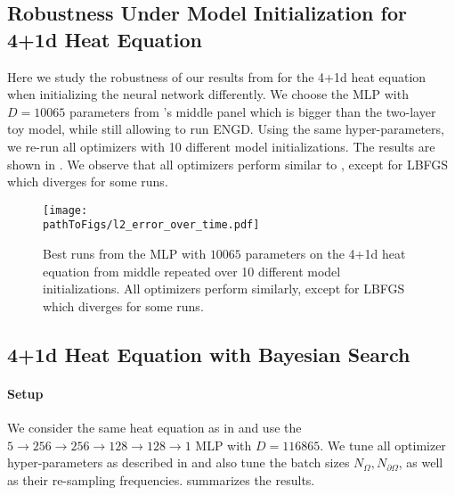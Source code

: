 \subsection{Robustness Under Model Initialization for 4+1d Heat Equation}\label{sec:4d-heat-robustness-app}

Here we study the robustness of our results from  for the 4+1d heat equation when initializing the neural network differently.
We choose the MLP with $D=\num{10065}$ parameters from 's middle panel which is bigger than the two-layer toy model, while still allowing to run ENGD.
Using the same hyper-parameters, we re-run all optimizers with 10 different model initializations.
The results are shown in .
We observe that all optimizers perform similar to , except for LBFGS which diverges for some runs.

\begin{figure}[!h]
  \centering
  \def\pathToFigs{kfac_pinns_exp/exp41_errorbars_exp28}
  \texttt{[image: \\pathToFigs/l2\_error\_over\_time.pdf]}
  \caption{Best runs from the MLP with $\num{10065}$ parameters on the 4+1d heat equation from  middle repeated over 10 different model initializations. All optimizers perform similarly, except for LBFGS which diverges for some runs.}
  \label{fig:heat4d-robustness-appendix}
\end{figure}

\subsection{4+1d Heat Equation with Bayesian Search}\label{sec:4d-heat-bayes-app}

\paragraph{Setup} We consider the same heat equation as in  and use the $5 \to 256 \to 256\to 128 \to 128 \to 1$ MLP with $D=\num{116865}$.
We tune all optimizer hyper-parameters as described in  and also tune the batch sizes $N_{\Omega}, N_{\partial \Omega}$, as well as their re-sampling frequencies.
 summarizes the results.

